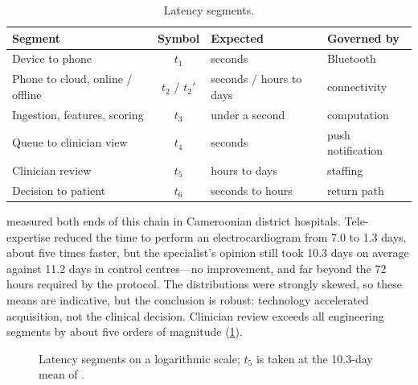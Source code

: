 \begin{table}[htbp]
\centering\small
\caption{Latency segments.}\label{tab:latency}
\begin{tabularx}{\textwidth}{@{}X c >{\raggedright\arraybackslash}p{2.6cm} >{\raggedright\arraybackslash}p{3.0cm}@{}}
\toprule
\textbf{Segment} & \textbf{Symbol} & \textbf{Expected} & \textbf{Governed by} \\
\midrule
Device to phone & $t_1$ & seconds & Bluetooth \\
Phone to cloud, online / offline & $t_2$ / $t_2'$ & seconds / hours to days & connectivity \\
Ingestion, features, scoring & $t_3$ & under a second & computation \\
Queue to clinician view & $t_4$ & seconds & push notification \\
Clinician review & $t_5$ & hours to days & staffing \\
Decision to patient & $t_6$ & seconds to hours & return path \\
\bottomrule
\end{tabularx}
\end{table}

\Textcite{bediang2021} measured both ends of this chain in Cameroonian district hospitals. Tele-expertise reduced the time to perform an electrocardiogram from 7.0 to 1.3 days, about five times faster, but the specialist's opinion still took 10.3 days on average against 11.2 days in control centres---no improvement, and far beyond the 72 hours required by the protocol. The distributions were strongly skewed, so these means are indicative, but the conclusion is robust: technology accelerated acquisition, not the clinical decision. Clinician review exceeds all engineering segments by about five orders of magnitude (\cref{fig:latency}).

\begin{figure}[htbp]
\centering
{}
\caption{Latency segments on a logarithmic scale; $t_5$ is taken at the 10.3-day mean of \textcite{bediang2021}.}\label{fig:latency}
\end{figure}

